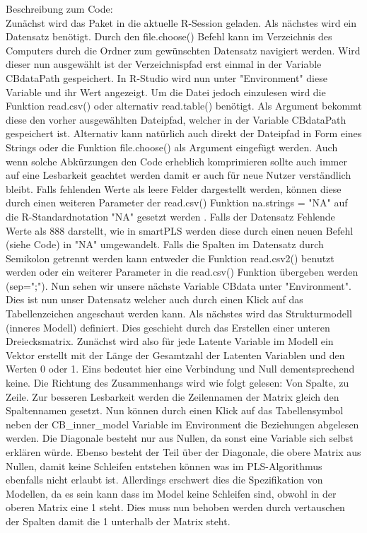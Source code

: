\documentclass{article}\usepackage[]{graphicx}\usepackage[]{color}
\begin{document}
Beschreibung zum Code:\\
Zunächst wird das Paket in die aktuelle R-Session geladen. Als nächstes wird ein Datensatz benötigt. Durch den file.choose() Befehl kann im Verzeichnis des Computers durch die Ordner zum gewünschten Datensatz navigiert werden. Wird dieser nun ausgewählt ist der Verzeichnispfad erst einmal in der Variable CBdataPath gespeichert. In R-Studio wird nun unter "Environment" diese Variable und ihr Wert angezeigt. Um die Datei jedoch einzulesen wird die Funktion read.csv() oder alternativ read.table() benötigt. Als Argument bekommt diese den vorher ausgewählten Dateipfad, welcher in der Variable CBdataPath gespeichert ist. Alternativ kann natürlich auch direkt der Dateipfad in Form eines Strings oder die Funktion file.choose() als Argument eingefügt werden. Auch wenn solche Abkürzungen den Code erheblich komprimieren sollte auch immer auf eine Lesbarkeit geachtet werden damit er auch für neue Nutzer verständlich bleibt. Falls fehlenden Werte als leere Felder dargestellt werden, können diese durch einen weiteren Parameter der read.csv() Funktion na.strings = "NA" auf die R-Standardnotation "NA" gesetzt werden . Falls der Datensatz Fehlende Werte als 888 darstellt, wie in smartPLS werden diese durch einen neuen Befehl (siehe Code) in "NA" umgewandelt. Falls die Spalten im Datensatz durch Semikolon getrennt werden kann entweder die Funktion read.csv2() benutzt werden oder ein weiterer Parameter in die read.csv() Funktion übergeben werden (sep=";"). Nun sehen wir unsere nächste Variable CBdata unter "Environment". Dies ist nun unser Datensatz welcher auch durch einen Klick auf das Tabellenzeichen angeschaut werden kann. Als nächstes wird das Strukturmodell (inneres Modell) definiert. Dies geschieht durch das Erstellen einer unteren Dreiecksmatrix. Zunächst wird also für jede Latente Variable im Modell ein Vektor erstellt mit der Länge der Gesamtzahl der Latenten Variablen und den Werten 0 oder 1. Eins bedeutet hier eine Verbindung und Null dementsprechend keine. Die Richtung des Zusammenhangs wird wie folgt gelesen: Von Spalte, zu Zeile. Zur besseren Lesbarkeit werden die Zeilennamen der Matrix gleich den Spaltennamen gesetzt. Nun können durch einen Klick auf das Tabellensymbol neben der CB\_inner\_model Variable im Environment die Beziehungen abgelesen werden. Die Diagonale besteht nur aus Nullen, da sonst eine Variable sich selbst erklären würde. Ebenso besteht der Teil über der Diagonale, die obere Matrix aus Nullen, damit keine Schleifen entstehen können was im PLS-Algorithmus ebenfalls nicht erlaubt ist. Allerdings erschwert dies die Spezifikation von Modellen, da es sein kann dass im Model keine Schleifen sind, obwohl in der oberen Matrix eine 1 steht. Dies muss nun behoben werden durch vertauschen der Spalten damit die 1 unterhalb der Matrix steht.
\end{document}
